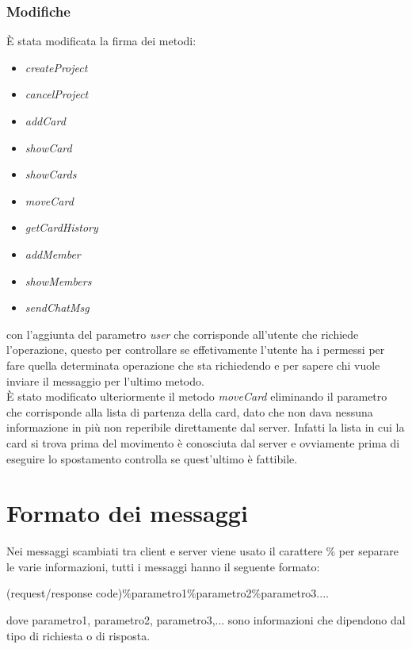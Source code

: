 \documentclass[11pt]{report}
\begin{document}
	\subsection{Modifiche}
	È stata modificata la firma dei metodi:
		\begin{itemize}
			\item \textit{createProject}
			\item \textit{cancelProject}
			\item \textit{addCard}
			\item \textit{showCard}
			\item \textit{showCards}
			\item \textit{moveCard}
			\item \textit{getCardHistory}
			\item \textit{addMember}
			\item \textit{showMembers}
			\item \textit{sendChatMsg}
		\end{itemize}
	con l'aggiunta del parametro \textit{user} che corrisponde all'utente che richiede l'operazione, questo per controllare se effetivamente l'utente ha i permessi per fare quella determinata operazione che sta richiedendo e per sapere chi vuole inviare il messaggio per l'ultimo metodo.\\
	È stato modificato ulteriormente il metodo \textit{moveCard} eliminando il parametro che corrisponde alla lista di partenza della card, dato che non dava nessuna informazione in più non reperibile direttamente dal server. Infatti la lista in cui la card si trova prima del movimento è conosciuta dal server e ovviamente prima di eseguire lo spostamento controlla se quest'ultimo è fattibile.
	
	\chapter{Formato dei messaggi}
	Nei messaggi scambiati tra client e server viene usato il carattere \% per separare le varie informazioni, tutti i messaggi hanno il seguente formato:
	\begin{center}
		(request/response code)\%parametro1\%parametro2\%parametro3....
	\end{center}
	dove parametro1, parametro2, parametro3,... sono informazioni che dipendono dal tipo di richiesta o di risposta.
	
\end{document}
